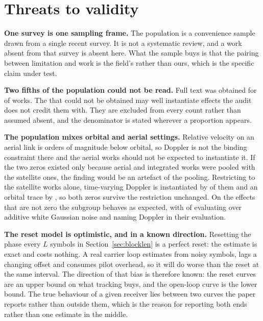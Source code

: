 \documentclass[preprint,11pt,3p]{elsarticle}
\begin{document}
\section{Threats to validity}
\label{sec:threats}

\textbf{One survey is one sampling frame.} The population is a convenience sample drawn from a
single recent survey. It is not a systematic review, and a work absent from that survey is absent
here. What the sample buys is that the pairing between limitation and work is the field's rather
than ours, which is the specific claim under test.

\textbf{Two fifths of the population could not be read.} Full text was obtained for \numFull{} of
\numPop{} works. The \numNotFull{} that could not be obtained may well instantiate effects the
audit does not credit them with. They are excluded from every count rather than assumed absent,
and the denominator \numCoded{} is stated wherever a proportion appears.

\textbf{The population mixes orbital and aerial settings.} Relative velocity on an aerial link
is orders of magnitude below orbital, so Doppler is not the binding constraint there and the
aerial works should not be expected to instantiate it. If the two zeros existed only because
\numAerial{} aerial and \numIntegrated{} integrated works were pooled with the satellite ones,
the finding would be an artefact of the pooling. Restricting to the \numSat{} satellite works
alone, time-varying Doppler is instantiated by \numSatDopRate{} of them and an orbital trace by
\numSatTrace{}, so both zeros survive the restriction unchanged. On the effects that are not
zero the subgroup behaves as expected, with \numSatAwgn{} of \numSat{} evaluating over additive
white Gaussian noise and \numSatDop{} naming Doppler in their evaluation.

\textbf{The reset model is optimistic, and in a known direction.} Resetting the phase every $L$
symbols in Section~\ref{sec:blocklen} is a perfect reset: the estimate is exact and costs
nothing. A real carrier loop estimates from noisy symbols, lags a changing offset and consumes
pilot overhead, so it will do worse than the reset at the same interval. The direction of that
bias is therefore known: the reset curves are an upper bound on what tracking buys, and the
open-loop curve is the lower bound. The true behaviour of a given receiver lies between two
curves the paper reports rather than outside them, which is the reason for reporting both ends
rather than one estimate in the middle.
\end{document}
